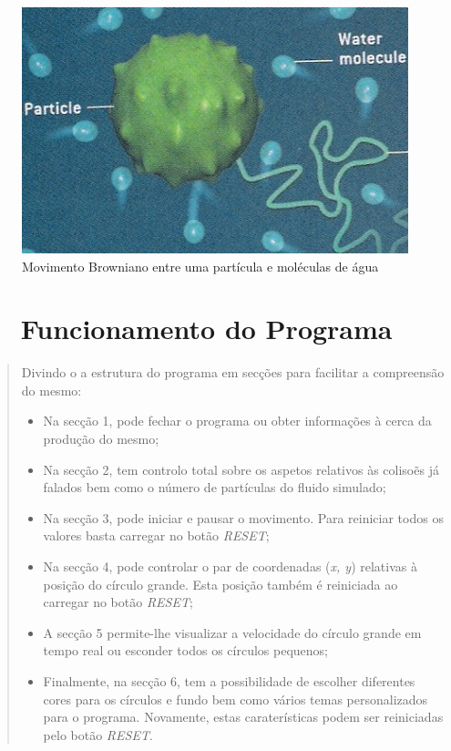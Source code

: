 \documentclass[11pt]{article}
\begin{document}
\begin{figure}[hb]
\centering
\includegraphics[scale=1]{brownian}
\caption{\footnotesize Movimento Browniano entre uma part\'{i}cula e mol\'{e}culas de \'{a}gua}
\end{figure}

\newpage

\section*{$\quad$ Funcionamento do Programa}
\begin{quote}
 Divindo o a estrutura do programa em sec\c{c}\~{o}es para facilitar a compreens\~{a}o do mesmo:
 \begin{itemize}
 \item Na sec\c{c}\~{a}o {\color{red} 1}, pode fechar o programa ou obter informa\c{c}\~{o}es \`{a} cerca da produ\c{c}\~{a}o do mesmo;
 \item Na sec\c{c}\~{a}o {\color{red} 2}, tem controlo total sobre os aspetos relativos \`{a}s coliso\~{e}s j\'{a} falados bem como o n\'{u}mero de part\'{i}culas do fluido simulado;
 \item Na sec\c{c}\~{a}o {\color{red} 3}, pode iniciar e pausar o movimento. Para reiniciar todos os valores basta carregar no bot\~{a}o \textit{RESET};
 \item Na sec\c{c}\~{a}o {\color{red} 4}, pode controlar o par de coordenadas (\textit{x, y}) relativas \`{a} posi\c{c}\~{a}o do c\'{i}rculo grande. Esta posi\c{c}\~{a}o tamb\'{e}m \'{e} reiniciada ao carregar no bot\~{a}o \textit{RESET};
 \item A sec\c{c}\~{a}o {\color{red} 5} permite-lhe visualizar a velocidade do c\'{i}rculo grande em tempo real ou esconder todos os c\'{i}rculos pequenos;
 \item Finalmente, na sec\c{c}\~{a}o {\color{red} 6}, tem a possibilidade de escolher diferentes cores para os c\'{i}rculos e fundo bem como v\'{a}rios temas personalizados para o programa. Novamente, estas carater\'{i}sticas podem ser reiniciadas pelo bot\~{a}o \textit{RESET}.
\end{itemize}
\end{quote}
\end{document}
